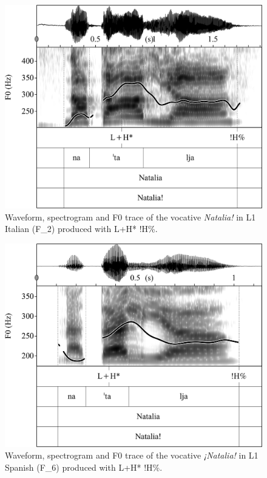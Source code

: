 \begin{figure}[p]
\includegraphics[width=.8\textwidth]{figures/Figure_4.135.png}
\caption{Waveform, spectrogram and F0 trace of the vocative \textit{Natalia!} in L1 Italian (F\_2) produced with L+H* !H\%.}
\label{fig:4.135}
\end{figure}

\begin{figure}[p]
\includegraphics[width=.8\textwidth]{figures/Figure_4.136.png}
\caption{Waveform, spectrogram and F0 trace of the vocative \textit{¡Natalia!} in L1 Spanish (F\_6) produced with L+H* !H\%.}
\label{fig:4.136}
\end{figure}



